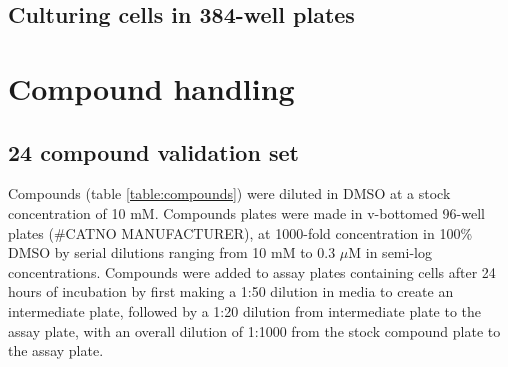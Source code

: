 \documentclass[a4paper,11pt,twoside,openright]{scrbook}
\begin{document}
\subsection{Culturing cells in 384-well plates}


\section{Compound handling}

\subsection{24 compound validation set}

Compounds (table \ref{table:compounds}) were diluted in DMSO at a stock concentration of 10 mM.
Compounds plates were made in v-bottomed 96-well plates (\#CATNO MANUFACTURER), at 1000-fold concentration in 100\% DMSO by serial dilutions ranging from 10 mM to 0.3 $\mu$M in semi-log concentrations.
Compounds were added to assay plates containing cells after 24 hours of incubation by first making a 1:50 dilution in media to create an intermediate plate, followed by a 1:20 dilution from intermediate plate to the assay plate, with an overall dilution of 1:1000 from the stock compound plate to the assay plate.
\end{document}
